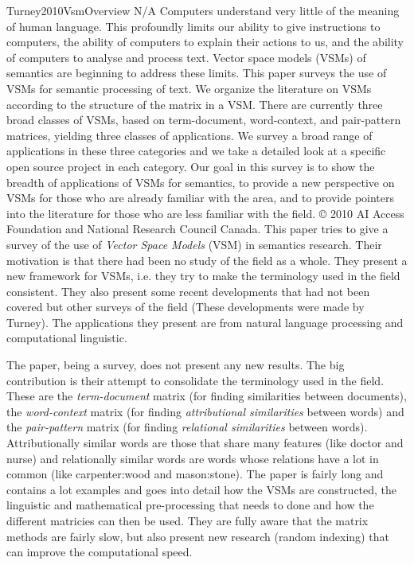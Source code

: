\begin{review}
        {Turney2010VsmOverview}
        {N/A}
        {
            Computers understand very little of the meaning of human language. 
            This profoundly limits our ability to give instructions to computers, the ability of computers to explain their actions to us, and the ability of computers to analyse and process text. 
            Vector space models (VSMs) of semantics are beginning to address these limits. 
            This paper surveys the use of VSMs for semantic processing of text. 
            We organize the literature on VSMs according to the structure of the matrix in a VSM. 
            There are currently three broad classes of VSMs, based on term-document, word-context, and pair-pattern matrices, yielding three classes of applications. 
            We survey a broad range of applications in these three categories and we take a detailed look at a specific open source project in each category. 
            Our goal in this survey is to show the breadth of applications of VSMs for semantics, to provide a new perspective on VSMs for those who are already familiar with the area, and to provide pointers into the literature for those who are less familiar with the field. 
            © 2010 AI Access Foundation and National Research Council Canada.
        }
    This paper tries to give a survey of the use of \emph{Vector Space Models} (VSM) in semantics research.
    Their motivation is that there had been no study of the field as a whole.
    They present a new framework for VSMs, i.e. they try to make the terminology used in the field consistent.
    They also present some recent developments that had not been covered but other surveys of the field (These developments were made by Turney).
    The applications they present are from natural language processing and computational linguistic.
    
    The paper, being a survey, does not present any new results.
    The big contribution is their attempt to consolidate the terminology used in the field.
    These are the \emph{term-document} matrix (for finding similarities between documents), the \emph{word-context} matrix (for finding \emph{attributional similarities} between words) and the \emph{pair-pattern} matrix (for finding \emph{relational similarities} between words).
    Attributionally similar words are those that share many features (like doctor and nurse) and relationally similar words are words whose relations have a lot in common (like carpenter:wood and mason:stone).
    The paper is fairly long and contains a lot examples and goes into detail how the VSMs are constructed, the linguistic and mathematical pre-processing that needs to done and how the different matricies can then be used.
    They are fully aware that the matrix methods are fairly slow, but also present new research (random indexing) that can improve the computational speed.
    

\end{review}
